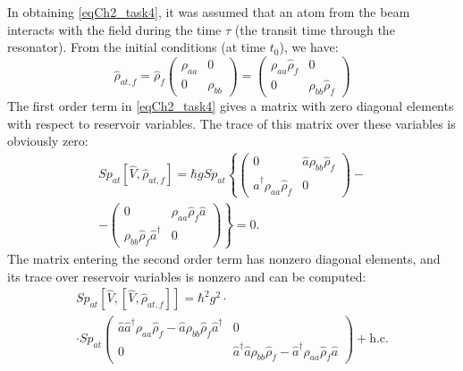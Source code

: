 In obtaining \eqref{eqCh2_task4}, it was assumed that an atom from the beam interacts with the field during the time $\tau$ (the transit time through the resonator). From the initial conditions (at time $t_0$), we have:  
\begin{equation}
\hat{\rho}_{at, f} = \hat{\rho}_{f}
\left(
\begin{array} {cc}
\rho_{aa} & 0  
\\
0 & \rho_{bb} 
\end{array}
\right) = 
\left(
\begin{array} {cc}
\rho_{aa}\hat{\rho}_{f} & 0  
\\
0 & \rho_{bb}\hat{\rho}_{f}
\end{array}
\right)
\end{equation}
The first order term in \eqref{eqCh2_task4} gives a matrix with zero diagonal elements with respect to reservoir variables. The trace of this matrix over these variables is obviously zero:
\begin{eqnarray}
Sp_{at}\left[\hat{V}, \hat{\rho}_{at, f}\right] = 
\hbar g Sp_{at}
\left\{
\left(
\begin{array} {cc}
0 & \hat{a} \rho_{bb}\hat{\rho}_{f}  
\\
\hat{a}^{\dag} \rho_{aa}\hat{\rho}_{f}   & 0
\end{array}
\right)
\right.
-
\nonumber \\
-
\left.
\left(
\begin{array} {cc}
0 & \rho_{aa} \hat{\rho}_{f} \hat{a}   
\\
\rho_{bb} \hat{\rho}_{f} \hat{a}^{\dag}   & 0
\end{array}
\right)
\right\}
= 0.
\label{eqCh2_sp_1}
\end{eqnarray}
The matrix entering the second order term has nonzero diagonal elements, and its trace over reservoir variables is nonzero and can be computed:
\begin{eqnarray}
Sp_{at}\left[\hat{V},\left[\hat{V}, \hat{\rho}_{at, f}\right] \right]
= \hbar^2 g^2 \cdot
\nonumber \\
\cdot Sp_{at}
\left(
\begin{array} {cc}
\hat{a} \hat{a}^{\dag}\rho_{aa} \hat{\rho}_{f} -
\hat{a}\rho_{bb} \hat{\rho}_{f}\hat{a}^{\dag}  & 0
\\
0 & 
\hat{a}^{\dag} \hat{a}\rho_{bb} \hat{\rho}_{f} -
\hat{a}^{\dag}\rho_{aa} \hat{\rho}_{f}\hat{a} 
\end{array}
\right) + \text{h.c.} 
\label{eqCh2_sp_2}
\end{eqnarray}
